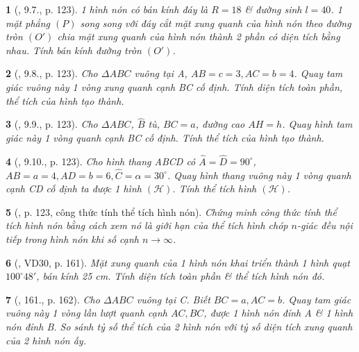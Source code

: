 \documentclass{article}
\newtheorem{baitoan}{}
\begin{document}
\begin{baitoan}[\cite{Binh_boi_duong_Toan_9_tap_2}, 9.7., p. 123]
	1 hình nón có bán kính đáy là $R = 18$ \& đường sinh $l = 40$. 1 mặt phẳng $(P)$ song song với đáy cắt mặt xung quanh của hình nón theo đường tròn $(O')$ chia mặt xung quanh của hình nón thành 2 phần có diện tích bằng nhau. Tính bán kính đường tròn $(O')$.
\end{baitoan}

\begin{baitoan}[\cite{Binh_boi_duong_Toan_9_tap_2}, 9.8., p. 123]
	Cho $\Delta ABC$ vuông tại A, $AB = c = 3,AC = b = 4$. Quay tam giác vuông này 1 vòng xung quanh cạnh BC cố định. Tính diện tích toàn phần, thể tích của hình tạo thành.
\end{baitoan}

\begin{baitoan}[\cite{Binh_boi_duong_Toan_9_tap_2}, 9.9., p. 123]
	Cho $\Delta ABC$, $\widehat{B}$ tù, $BC = a$, đường cao $AH = h$. Quay hình tam giác này 1 vòng quanh cạnh BC cố định. Tính thể tích của hình tạo thành.
\end{baitoan}

\begin{baitoan}[\cite{Binh_boi_duong_Toan_9_tap_2}, 9.10., p. 123]
	Cho hình thang ABCD có $\widehat{A} = \widehat{D} = 90^\circ$, $AB = a = 4,AD = b = 6,\widehat{C} = \alpha = 30^\circ$. Quay hình thang vuông này 1 vòng quanh cạnh CD cố định ta được 1 hình $(\mathcal{H})$. Tính thể tích hình $(\mathcal{H})$.
\end{baitoan}

\begin{baitoan}[\cite{Binh_boi_duong_Toan_9_tap_2}, p. 123, công thức tính thể tích hình nón]
	Chứng minh công thức tính thể tích hình nón bằng cách xem nó là giới hạn của thể tích hình chóp $n$-giác đều nội tiếp trong hình nón khi số cạnh $n\to\infty$.
\end{baitoan}

\begin{baitoan}[\cite{Tuyen_Toan_9_old}, VD30, p. 161]
	Mặt xung quanh của 1 hình nón khai triển thành 1 hình quạt $100^\circ48'$, bán kính {\rm25 cm}. Tính diện tích toàn phần \& thể tích hình nón đó.
\end{baitoan}

\begin{baitoan}[\cite{Tuyen_Toan_9_old}, 161., p. 162]
	Cho $\Delta ABC$ vuông tại C. Biết $BC = a,AC = b$. Quay tam giác vuông này 1 vòng lần lượt quanh cạnh $AC,BC$, được 1 hình nón đỉnh A \& 1 hình nón đỉnh B. So sánh tỷ số thể tích của 2 hình nón với tỷ số diện tích xung quanh của 2 hình nón ấy.
\end{baitoan}
\end{document}
